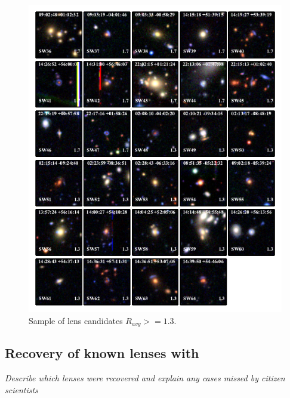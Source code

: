 \documentclass[useAMS,usenatbib,a4paper]{mn2e}
\begin{document}
\begin{figure}
\begin{center}
\includegraphics[scale=2.0]{sw-cfhtls-figs/lenscandfin_1.pdf}
\caption{ \label{fig:lcl}
Sample of lens candidates $R_{avg}>=1.3$.
}
\end{center}
\end{figure}



\subsection{Recovery of known \cfhtls lenses with \sw}
\label{sec:results:known}

{\it Describe which lenses were recovered and explain any cases missed by
citizen scientists}
\end{document}
